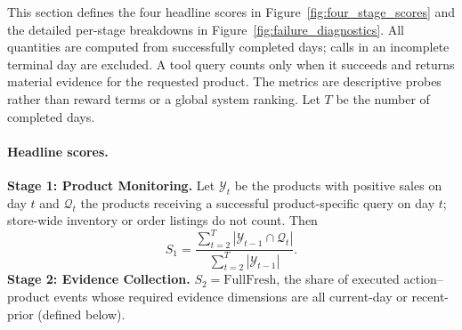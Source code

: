 This section defines the four headline scores in Figure~\ref{fig:four_stage_scores} and the detailed per-stage breakdowns in Figure~\ref{fig:failure_diagnostics}. All quantities are computed from successfully completed days; calls in an incomplete terminal day are excluded. A tool query counts only when it succeeds and returns material evidence for the requested product. The metrics are descriptive probes rather than reward terms or a global system ranking. Let $T$ be the number of completed days.



\paragraph{Headline scores.}
\textbf{Stage 1: Product Monitoring.} Let $\mathcal{Y}_{t}$ be the products with positive sales on day $t$ and $\mathcal{Q}_t$ the products receiving a successful product-specific query on day $t$; store-wide inventory or order listings do not count. Then
\begin{equation}
S_1=\frac{\sum_{t=2}^{T}|\mathcal{Y}_{t-1}\cap\mathcal{Q}_t|}{\sum_{t=2}^{T}|\mathcal{Y}_{t-1}|}.
\end{equation}
\textbf{Stage 2: Evidence Collection.} $S_2=\mathrm{FullFresh}$, the share of executed action--product events whose required evidence dimensions are all current-day or recent-prior (defined below).

